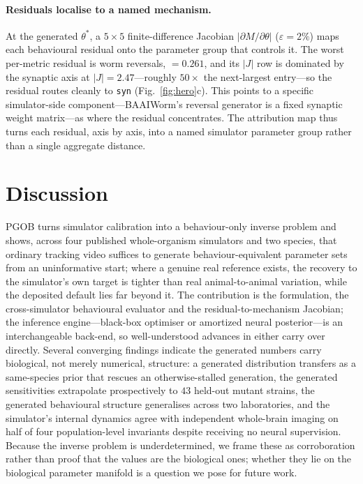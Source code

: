 \documentclass[11pt]{article}
\begin{document}
\paragraph{Residuals localise to a named mechanism.} At the generated $\theta^{*}$, a $5\times5$ finite-difference Jacobian $|\partial M/\partial\theta|$ ($\varepsilon{=}2\%$) maps each behavioural residual onto the parameter group that controls it. The worst per-metric residual is worm reversals, $=0.261$, and its $|J|$ row is dominated by the synaptic axis at $|J|{=}2.47$---roughly $50\times$ the next-largest entry---so the residual routes cleanly to \texttt{syn} (Fig.~\ref{fig:hero}c). This points to a specific simulator-side component---BAAIWorm's reversal generator is a fixed synaptic weight matrix---as where the residual concentrates. The attribution map thus turns each residual, axis by axis, into a named simulator parameter group rather than a single aggregate distance.

\section*{Discussion}
PGOB turns simulator calibration into a behaviour-only inverse problem and shows, across four published whole-organism simulators and two species, that ordinary tracking video suffices to generate behaviour-equivalent parameter sets from an uninformative start; where a genuine real reference exists, the recovery to the simulator's own target is tighter than real animal-to-animal variation, while the deposited default lies far beyond it. The contribution is the formulation, the cross-simulator behavioural evaluator and the residual-to-mechanism Jacobian; the inference engine---black-box optimiser or amortized neural posterior---is an interchangeable back-end, so well-understood advances in either carry over directly. Several converging findings indicate the generated numbers carry biological, not merely numerical, structure: a generated distribution transfers as a same-species prior that rescues an otherwise-stalled generation, the generated sensitivities extrapolate prospectively to $43$ held-out mutant strains, the generated behavioural structure generalises across two laboratories, and the simulator's internal dynamics agree with independent whole-brain imaging on half of four population-level invariants despite receiving no neural supervision. Because the inverse problem is underdetermined, we frame these as corroboration rather than proof that the values are the biological ones; whether they lie on the biological parameter manifold is a question we pose for future work.
\end{document}
